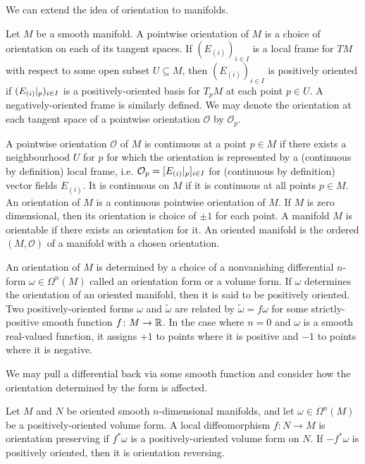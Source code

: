 \documentclass[a4paper,12pt]{article}
\begin{document}
We can extend the idea of orientation to manifolds.
\begin{definition}\label{def:orientation_of_manifold}
    Let $M$ be a smooth manifold.
    A pointwise orientation of $M$ is a choice of orientation on each of its tangent spaces.
    If $(E_{(i)})_{i \in I}$ is a local frame for $TM$ with respect to some open subset $U \subseteq M$, then $(E_{(i)})_{i \in I}$ is positively oriented if $(\eval*{E_{(i)}}{p})_{i \in I}$ is a positively-oriented basis for $T_p M$ at each point $p \in U$.
    A negatively-oriented frame is similarly defined.
    We may denote the orientation at each tangent space of a pointwise orientation $\mathcal{O}$ by $\mathcal{O}_p$.

    A pointwise orientation $\mathcal{O}$ of $M$ is continuous at a point $p \in M$ if there exists a neighbourhood $U$ for $p$ for which the orientation is represented by a (continuous by definition) local frame, i.e. $\mathcal{O}_p = [\eval*{E_{(i)}}{p}]_{i \in I}$ for (continuous by definition) vector fields $E_{(i)}$.
    It is continuous on $M$ if it is continuous at all points $p \in M$.
    An orientation of $M$ is a continuous pointwise orientation of $M$.
    If $M$ is zero dimensional, then its orientation is choice of $\pm 1$ for each point.
    A manifold $M$ is orientable if there exists an orientation for it.
    An oriented manifold is the ordered $(M, \mathcal{O})$ of a manifold with a chosen orientation.
\end{definition}
An orientation of $M$ is determined by a choice of a nonvanishing differential $n$-form $\omega \in \Omega^n(M)$ called an orientation form or a volume form.
If $\omega$ determines the orientation of an oriented manifold, then it is said to be positively oriented.
Two positively-oriented forms $\omega$ and $\tilde{\omega}$ are related by $\tilde{\omega} = f\omega$ for some strictly-positive smooth function $f \colon M \to \mathbb{R}$.
In the case where $n = 0$ and $\omega$ is a smooth real-valued function, it assigns $+1$ to points where it is positive and $-1$ to points where it is negative.

We may pull a differential back via some smooth function and consider how the orientation determined by the form is affected.
\begin{definition}
    Let $M$ and $N$ be oriented smooth $n$-dimensional manifolds, and let $\omega \in \Omega^n(M)$ be a positively-oriented volume form.
    A local diffeomorphism $f \colon N \to M$ is orientation preserving if $f^*\omega$ is a positively-oriented volume form on $N$.
    If $-f^*\omega$ is positively oriented, then it is orientation reversing.
\end{definition}
\end{document}
